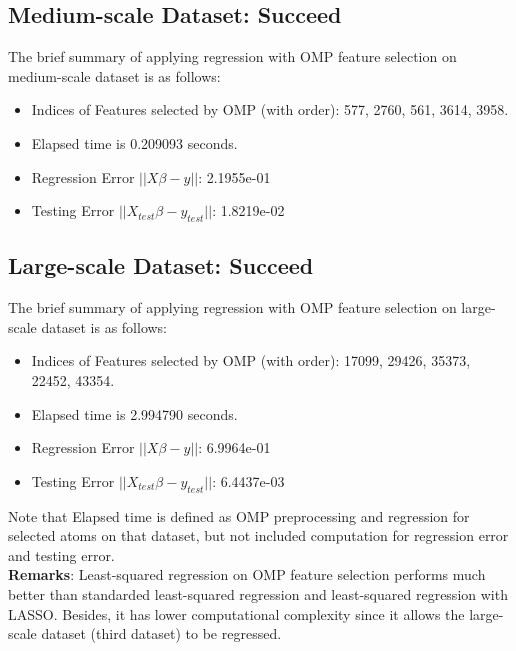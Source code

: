 \documentclass[11pt,a4paper]{report}
\begin{document}
\subsection{Medium-scale Dataset: Succeed}
The brief summary of applying regression with OMP feature selection on
medium-scale dataset is as follows:
\begin{itemize}
\item Indices of Features selected by OMP (with order): 577, 2760, 561, 3614,
    3958. 
\item Elapsed time is 0.209093 seconds.
\item Regression Error $||X \beta - y||$: 2.1955e-01
\item Testing Error $||X_{test} \beta - y_{test}||$: 1.8219e-02
\end{itemize}

\subsection{Large-scale Dataset: Succeed}
The brief summary of applying regression with OMP feature selection on
large-scale dataset is as follows:
\begin{itemize}
\item Indices of Features selected by OMP (with order): 17099, 29426, 35373,
    22452, 43354. 
\item Elapsed time is 2.994790 seconds.
\item Regression Error $||X \beta - y||$: 6.9964e-01
\item Testing Error $||X_{test} \beta - y_{test}||$: 6.4437e-03
\end{itemize}

Note that Elapsed time is defined as OMP preprocessing and regression for
selected atoms on that dataset, but not included computation for regression
error and testing error. 
\\[0.3cm]

\noindent 
{\bf Remarks}: Least-squared regression on OMP feature selection performs much
better than standarded least-squared regression and least-squared regression
with LASSO. Besides, it has lower computational complexity since it allows the
large-scale dataset (third dataset) to be regressed.
\end{document}
